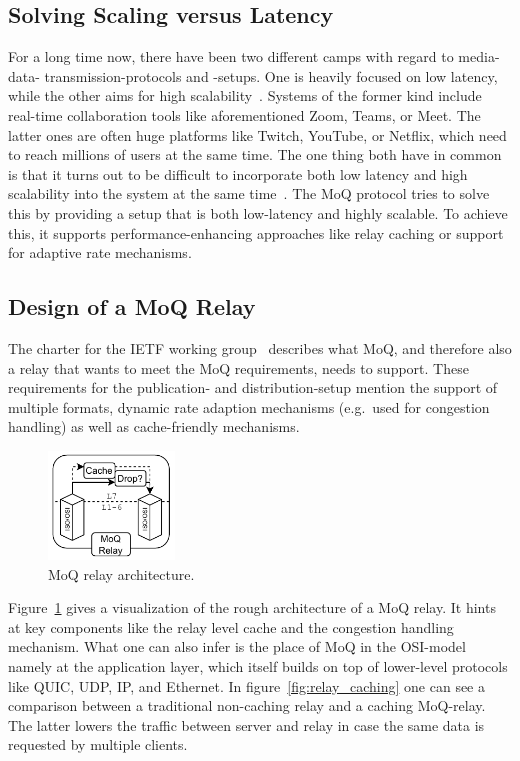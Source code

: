 \subsection{Solving Scaling versus Latency}
For a long time now, there have been two different camps with regard to media-data-
transmission-protocols and -setups.
One is heavily focused on low latency, while the other aims for high scalability~\parencite{what-is-moq}.
Systems of the former kind include real-time collaboration tools like aforementioned Zoom, Teams, or Meet.
The latter ones are often huge platforms like Twitch, YouTube, or Netflix, which need to 
reach millions of users at the same time.
The one thing both have in common is that it turns out to be difficult to incorporate both 
low latency and high scalability into the system at the same time~\parencite{what-is-moq}.
The MoQ protocol tries to solve this by providing a setup that is both low-latency and
highly scalable.
To achieve this, it supports performance-enhancing approaches like relay caching or support 
for adaptive rate mechanisms. %

\subsection{Design of a MoQ Relay}
The charter for the IETF working group~\parencite{moq-charter} describes what MoQ, and therefore also a relay 
that wants to meet the MoQ requirements, needs to support.
These requirements for the publication- and distribution-setup mention the support of 
multiple formats, dynamic rate adaption mechanisms (e.g.~used for congestion handling)
as well as cache-friendly mechanisms.

\begin{figure}[H]
    \centering
    \includegraphics[width=0.3\textwidth]{figures/02_background/moq-relay.drawio.pdf}
    \caption[MoQ relay architecture]{MoQ relay architecture.}\label{fig:moq_relay_architecture}
\end{figure}

Figure~\ref{fig:moq_relay_architecture} gives a visualization of the rough architecture
of a MoQ relay.
It hints at key components like the relay level cache and the congestion handling
mechanism.
What one can also infer is the place of MoQ in the OSI-model namely at the application
layer, which itself builds on top of lower-level protocols like QUIC, UDP, IP, and Ethernet.
In figure~\ref{fig:relay_caching} one can see a comparison between a traditional non-caching
relay and a caching MoQ-relay.
The latter lowers the traffic between server and relay in case the same data is requested
by multiple clients.

